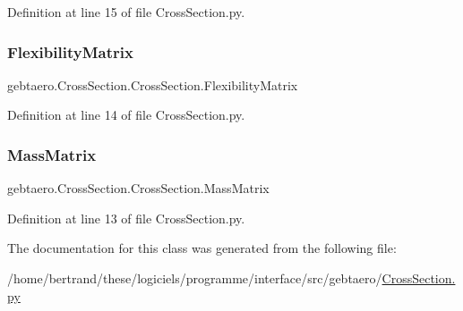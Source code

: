 Definition at line 15 of file Cross\+Section.\+py.

\mbox{\label{classgebtaero_1_1_cross_section_1_1_cross_section_ac20eafaf38ff757f9a8c9ae89212396a}} 
\subsubsection{\texorpdfstring{Flexibility\+Matrix}{FlexibilityMatrix}}
{\footnotesize\ttfamily gebtaero.\+Cross\+Section.\+Cross\+Section.\+Flexibility\+Matrix}



Definition at line 14 of file Cross\+Section.\+py.

\mbox{\label{classgebtaero_1_1_cross_section_1_1_cross_section_ae9be8649853163b2b4dfdaa3584d9f78}} 
\subsubsection{\texorpdfstring{Mass\+Matrix}{MassMatrix}}
{\footnotesize\ttfamily gebtaero.\+Cross\+Section.\+Cross\+Section.\+Mass\+Matrix}



Definition at line 13 of file Cross\+Section.\+py.



The documentation for this class was generated from the following file\+:\begin{DoxyCompactItemize}
\item 
/home/bertrand/these/logiciels/programme/interface/src/gebtaero/\hyperlink{_cross_section_8py}{Cross\+Section.\+py}\end{DoxyCompactItemize}

